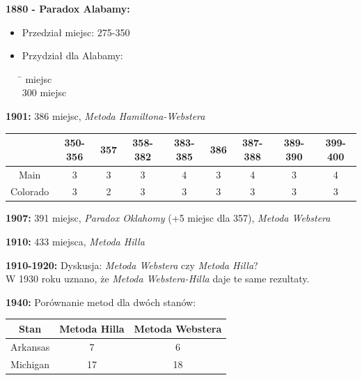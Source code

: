 \documentclass[12pt,a4paper]{article}
\theoremstyle{break}
\begin{document}
	\noindent \textbf{1880 - Paradox Alabamy:}
	
	\begin{itemize}
		\item Przedział miejsc: 275-350
		\item Przydział dla Alabamy:
		\begin{tabbing}
			\hspace{2cm} \= \hspace{3cm}   miejsc \\
			300  miejsc \\
		\end{tabbing}
	\end{itemize}
	
	\noindent \textbf{1901:} 386 miejsc, \textit{Metoda Hamiltona-Webstera}
	
	\begin{center}
		\begin{tabular}{|c|c|c|c|c|c|c|c|c|}
			\hline
			& 350-356 & 357 & 358-382 & 383-385 & 386 & 387-388 & 389-390 & 399-400 \\
			\hline
			Main & 3 & 3 & 3 & 4 & 3 & 4 & 3 & 4 \\
			\hline
			Colorado & 3 & 2 & 3 & 3 & 3 & 3 & 3 & 3 \\
			\hline
		\end{tabular}
	\end{center}
	
	\noindent \textbf{1907:} 391 miejsc, \textit{Paradox Oklahomy} (+5 miejsc dla 357), \textit{Metoda Webstera}
	
	\noindent \textbf{1910:} 433 miejsca, \textit{Metoda Hilla}
	
	\noindent \textbf{1910-1920:} Dyskusja: \textit{Metoda Webstera} czy \textit{Metoda Hilla}? \\
	W 1930 roku uznano, że \textit{Metoda Webstera-Hilla} daje te same rezultaty.
	
	\noindent \textbf{1940:} Porównanie metod dla dwóch stanów:
	
	\begin{center}
		\begin{tabular}{|c|c|c|}
			\hline
			Stan & Metoda Hilla & Metoda Webstera \\
			\hline
			Arkansas & 7 & 6 \\
			\hline
			Michigan & 17 & 18 \\
			\hline
		\end{tabular}
	\end{center}
	
\end{document}
